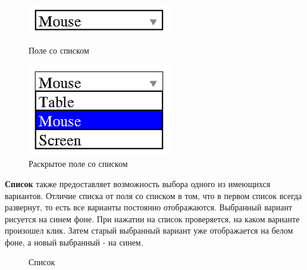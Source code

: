 \documentclass[14pt]{extarticle}
\begin{document}
		\begin{figure}[h]
		\begin{center}
		\begin{minipage}[h]{0.4\linewidth}
		\includegraphics[width=180pt]{pictures/comboBox1.png}
		\caption{ Поле со списком} %
		\label{ris:b1} %
		\end{minipage}
		\hfill 
		\begin{minipage}[h]{0.4\linewidth}
		\includegraphics[width=180pt]{pictures/comboBox2.png}
		\caption{Раскрытое поле со списком}
		\label{ris:b2}
		\end{minipage}
		\end{center}
		\end{figure}
		
	\textbf{Список} также предоставляет возможность выбора одного из имеющихся вариантов. Отличие списка от поля со списком в том, что в первом список всегда развернут, то есть все варианты постоянно отображаются. Выбранный вариант рисуется на синем фоне. При нажатии на список проверяется, на каком варианте произошел клик. Затем старый выбранный вариант уже отображается на белом фоне, а новый выбранный - на синем. 
		\begin{figure}[h]
		\caption{Список}
		\label{ris:image}
		\end{figure}	
	
\end{document}
